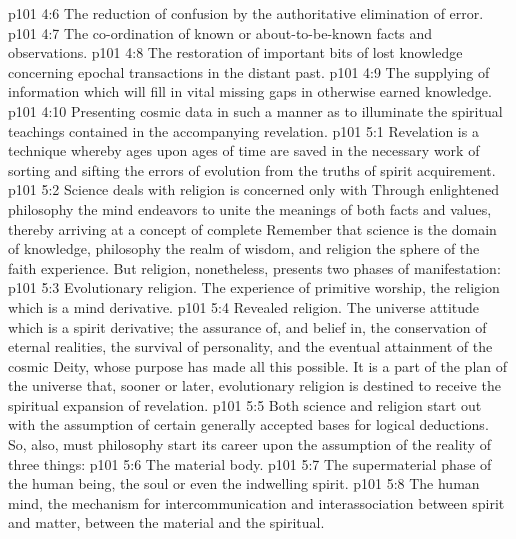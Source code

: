 \pc \vs p101 4:6 \bibnobreakspace The reduction of confusion by the authoritative elimination of error.
\vs p101 4:7 \bibnobreakspace The co\hyp{}ordination of known or about\hyp{}to\hyp{}be\hyp{}known facts and observations.
\vs p101 4:8 \bibnobreakspace The restoration of important bits of lost knowledge concerning epochal transactions in the distant past.
\vs p101 4:9 \bibnobreakspace The supplying of information which will fill in vital missing gaps in otherwise earned knowledge.
\vs p101 4:10 \bibnobreakspace Presenting cosmic data in such a manner as to illuminate the spiritual teachings contained in the accompanying revelation.\plusone
{}
\vs p101 5:1 Revelation is a technique whereby ages upon ages of time are saved in the necessary work of sorting and sifting the errors of evolution from the truths of spirit acquirement.\plusone
\vs p101 5:2 Science deals with  religion is concerned only with  Through enlightened philosophy the mind endeavors to unite the meanings of both facts and values, thereby arriving at a concept of complete  Remember that science is the domain of knowledge, philosophy the realm of wisdom, and religion the sphere of the faith experience. But religion, nonetheless, presents two phases of manifestation:
\pc \vs p101 5:3 \bibnobreakspace Evolutionary religion. The experience of primitive worship, the religion which is a mind derivative.
\vs p101 5:4 \bibnobreakspace Revealed religion. The universe attitude which is a spirit derivative; the assurance of, and belief in, the conservation of eternal realities, the survival of personality, and the eventual attainment of the cosmic Deity, whose purpose has made all this possible. It is a part of the plan of the universe that, sooner or later, evolutionary religion is destined to receive the spiritual expansion of revelation.
\pc \vs p101 5:5 Both science and religion start out with the assumption of certain generally accepted bases for logical deductions. So, also, must philosophy start its career upon the assumption of the reality of three things:
\pc \vs p101 5:6 \bibnobreakspace The material body.
\vs p101 5:7 \bibnobreakspace The supermaterial phase of the human being, the soul or even the indwelling spirit.
\vs p101 5:8 \bibnobreakspace The human mind, the mechanism for intercommunication and interassociation between spirit and matter, between the material and the spiritual.
